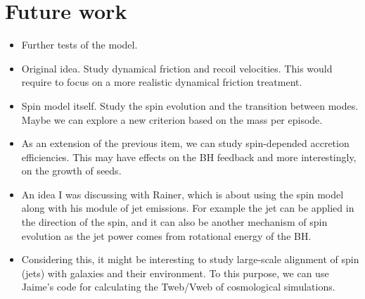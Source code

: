 \documentclass[a4,useAMS,usenatbib,usegraphicx,12pt]{article}
\begin{document}
\section{Future work}

\begin{itemize}
 \item Further tests of the model.
 \item Original idea. Study dynamical friction and recoil velocities. This would require to focus on a more 
 realistic dynamical friction treatment.
 \item Spin model itself. Study the spin evolution and the transition between modes. Maybe we can explore a
 new criterion based on the mass per episode. 
 \item As an extension of the previous item, we can study spin-depended accretion efficiencies. This may have
 effects on the BH feedback and more interestingly, on the growth of seeds.
 \item An idea I was discussing with Rainer, which is about using the spin model along with his module of jet emissions.
 For example the jet can be applied in the direction of the spin, and it can also be another mechanism of spin evolution
 as the jet power comes from rotational energy of the BH.
 \item Considering this, it might be interesting to study large-scale alignment of spin (jets) with galaxies and their 
 environment. To this purpose, we can use Jaime's code for calculating the Tweb/Vweb of cosmological simulations.
\end{itemize}
\end{document}

